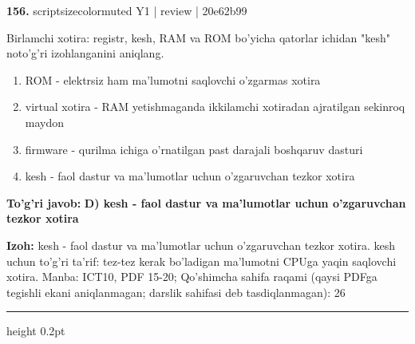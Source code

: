 \documentclass[10pt,a4paper]{article}
\begin{document}
{\bfseries\sffamily\color{ink} 156.} {scriptsizecolor{muted} Y1 | review | 20e62b99}
\par
Birlamchi xotira: registr, kesh, RAM va ROM bo'yicha qatorlar ichidan "kesh" noto'g'ri izohlanganini aniqlang.
\begin{enumerate}[label=\Alph*),leftmargin=9mm]
\item ROM - elektrsiz ham ma'lumotni saqlovchi o'zgarmas xotira
\item virtual xotira - RAM yetishmaganda ikkilamchi xotiradan ajratilgan sekinroq maydon
\item firmware - qurilma ichiga o'rnatilgan past darajali boshqaruv dasturi
\item kesh - faol dastur va ma'lumotlar uchun o'zgaruvchan tezkor xotira
\end{enumerate}
\begin{tcolorbox}[enhanced,breakable,colback=teal!4,colframe=teal!60!black,boxrule=0.45pt,arc=1.2mm,left=2.7mm,right=2.7mm,top=1.8mm,bottom=1.8mm,before skip=2mm,after skip=2mm]
{\bfseries\sffamily\color{teal}To'g'ri javob:} \textbf{D) kesh - faol dastur va ma'lumotlar uchun o'zgaruvchan tezkor xotira}
\par\smallskip
{\bfseries Izoh:} kesh - faol dastur va ma'lumotlar uchun o'zgaruvchan tezkor xotira. kesh uchun to'g'ri ta'rif: tez-tez kerak bo'ladigan ma'lumotni CPUga yaqin saqlovchi xotira. Manba: ICT10, PDF 15-20; Qo'shimcha sahifa raqami (qaysi PDFga tegishli ekani aniqlanmagan; darslik sahifasi deb tasdiqlanmagan): 26
\end{tcolorbox}
\vspace{2mm}\hrule height 0.2pt\vspace{3mm}
\end{document}
